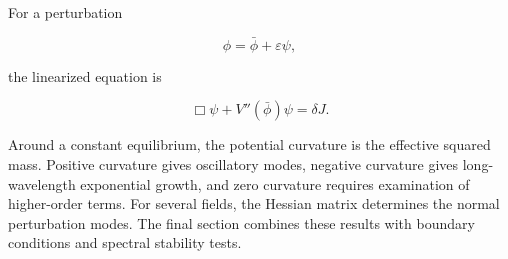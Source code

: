 For a perturbation

\[
\phi=\bar\phi+\varepsilon\psi,
\]

the linearized equation is

\[
\Box\psi+V''(\bar\phi)\psi=\delta J.
\]

Around a constant equilibrium, the potential curvature is the effective squared mass. Positive curvature gives oscillatory modes, negative curvature gives long-wavelength exponential growth, and zero curvature requires examination of higher-order terms. For several fields, the Hessian matrix determines the normal perturbation modes. The final section combines these results with boundary conditions and spectral stability tests.
